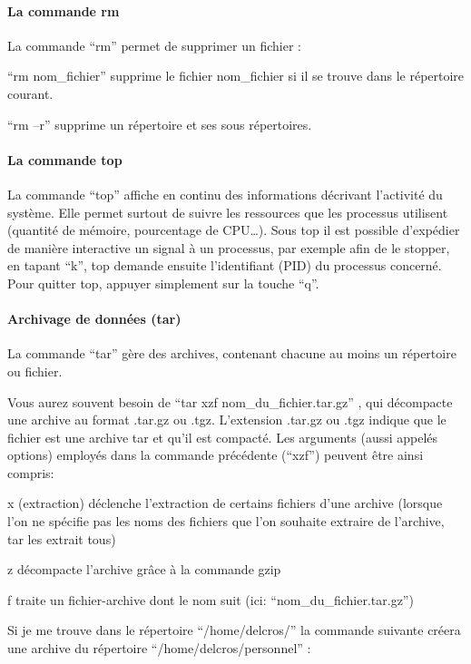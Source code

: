 \documentclass{article}
\begin{document}
    \paragraph{La commande rm}\label{la-commande-rm}

    La commande ``rm'' permet de supprimer un fichier :

``rm nom\_fichier'' supprime le fichier nom\_fichier si il se trouve
dans le répertoire courant.

``rm --r'' supprime un répertoire et ses sous répertoires.

    \paragraph{La commande top}\label{la-commande-top}

    La commande ``top'' affiche en continu des informations décrivant
l'activité du système. Elle permet surtout de suivre les ressources que
les processus utilisent (quantité de mémoire, pourcentage de
CPU\ldots{}). Sous top il est possible d'expédier de manière interactive
un signal à un processus, par exemple afin de le stopper, en tapant
``k'', top demande ensuite l'identifiant (PID) du processus concerné.
Pour quitter top, appuyer simplement sur la touche ``q''.

    \paragraph{Archivage de données
(tar)}\label{archivage-de-donnuxe9es-tar}

    La commande ``tar'' gère des archives, contenant chacune au moins un
répertoire ou fichier.

Vous aurez souvent besoin de ``tar xzf nom\_du\_fichier.tar.gz'' , qui
décompacte une archive au format .tar.gz ou .tgz. L'extension .tar.gz ou
.tgz indique que le fichier est une archive tar et qu'il est compacté.
Les arguments (aussi appelés options) employés dans la commande
précédente (``xzf'') peuvent être ainsi compris:

x (extraction) déclenche l'extraction de certains fichiers d'une archive
(lorsque l'on ne spécifie pas les noms des fichiers que l'on souhaite
extraire de l'archive, tar les extrait tous)

z décompacte l'archive grâce à la commande gzip

f traite un fichier-archive dont le nom suit (ici:
``nom\_du\_fichier.tar.gz'')

Si je me trouve dans le répertoire ``/home/delcros/'' la commande
suivante créera une archive du répertoire ``/home/delcros/personnel'' :
\end{document}
